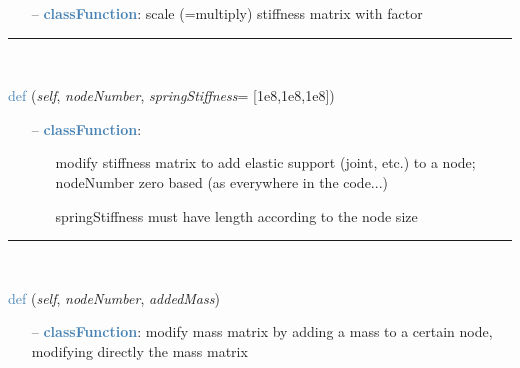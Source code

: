 \begin{itemize}[leftmargin=1.4cm]
\begin{itemize}[leftmargin=0.5cm]
\begin{itemize}[leftmargin=1.4cm]
\begin{itemize}[leftmargin=1.4cm]
\begin{itemize}[leftmargin=0.5cm]
\begin{flushleft}
\end{flushleft}
\setlength{\itemindent}{0.7cm}
\begin{itemize}[leftmargin=0.7cm]
  \item[--]  \textcolor{steelblue}{\bf classFunction}: scale (=multiply) stiffness matrix with factor\vspace{12pt}\end{itemize}
%
\noindent\rule{8cm}{0.75pt}\vspace{1pt} \\ 
\begin{flushleft}
\noindent \textcolor{steelblue}{def {\bf {}}}\label{sec:FEM:FEMinterface:AddElasticSupportAtNode}
({\it self}, {\it nodeNumber}, {\it springStiffness}= [1e8,1e8,1e8])
\end{flushleft}
\setlength{\itemindent}{0.7cm}
\begin{itemize}[leftmargin=0.7cm]
  \item[--]  \textcolor{steelblue}{\bf classFunction}: \vspace{-6pt}
  \begin{itemize}[leftmargin=1.2cm]
\setlength{\itemindent}{-0.7cm}
    \item[] modify stiffness matrix to add elastic support (joint, etc.) to a node; nodeNumber zero based (as everywhere in the code...)
    \item[] springStiffness must have length according to the node size
  \end{itemize}
\vspace{12pt}\end{itemize}
%
\noindent\rule{8cm}{0.75pt}\vspace{1pt} \\ 
\begin{flushleft}
\noindent \textcolor{steelblue}{def {\bf {}}}\label{sec:FEM:FEMinterface:AddNodeMass}
({\it self}, {\it nodeNumber}, {\it addedMass})
\end{flushleft}
\setlength{\itemindent}{0.7cm}
\begin{itemize}[leftmargin=0.7cm]
  \item[--]  \textcolor{steelblue}{\bf classFunction}: modify mass matrix by adding a mass to a certain node, modifying directly the mass matrix\vspace{12pt}\end{itemize}

\end{itemize}
\end{itemize}
\end{itemize}
\end{itemize}
\end{itemize}
